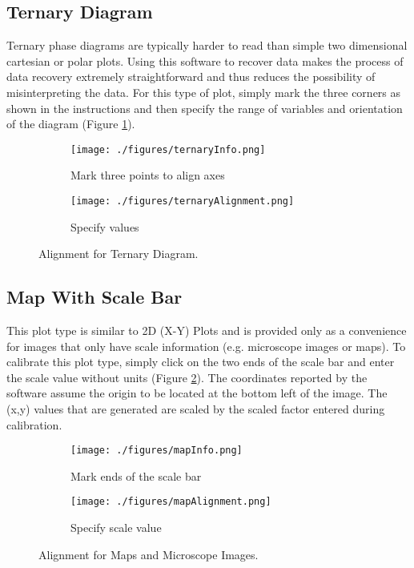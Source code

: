 \documentclass[letterpaper, 10pt]{article}
\begin{document}
\subsection{Ternary Diagram}
Ternary phase diagrams are typically harder to read than simple two dimensional cartesian or polar plots. Using this software to recover data makes the process of data recovery extremely straightforward and thus reduces the possibility of misinterpreting the data. For this type of plot, simply mark the three corners as shown in the instructions and then specify the range of variables and orientation of the diagram (Figure \ref{fig:ternaryAlignment}).

\begin{figure}
\centering
{\begin{subfigure}[b]{0.4\textwidth}
\texttt{[image: ./figures/ternaryInfo.png]}
\caption{Mark three points to align axes}
\end{subfigure}
\begin{subfigure}[b]{0.4\textwidth}
\texttt{[image: ./figures/ternaryAlignment.png]}
\caption{Specify values}
\end{subfigure}}
\caption{Alignment for Ternary Diagram.}
\label{fig:ternaryAlignment}
\end{figure}

\subsection{Map With Scale Bar}
This plot type is similar to 2D (X-Y) Plots and is provided only as a convenience for images that only have scale information (e.g. microscope images or maps). To calibrate this plot type, simply click on the two ends of the scale bar and enter the scale value without units (Figure \ref{fig:mapAlignment}). The coordinates reported by the software assume the origin to be located at the bottom left of the image. The (x,y) values that are generated are scaled by the scaled factor entered during calibration.

\begin{figure}
\centering
{\begin{subfigure}[b]{0.3\textwidth}
\texttt{[image: ./figures/mapInfo.png]}
\caption{Mark ends of the scale bar}
\end{subfigure}
\begin{subfigure}[b]{0.3\textwidth}
\texttt{[image: ./figures/mapAlignment.png]}
\caption{Specify scale value}
\end{subfigure}}
\caption{Alignment for Maps and Microscope Images.}
\label{fig:mapAlignment}
\end{figure}
\end{document}
